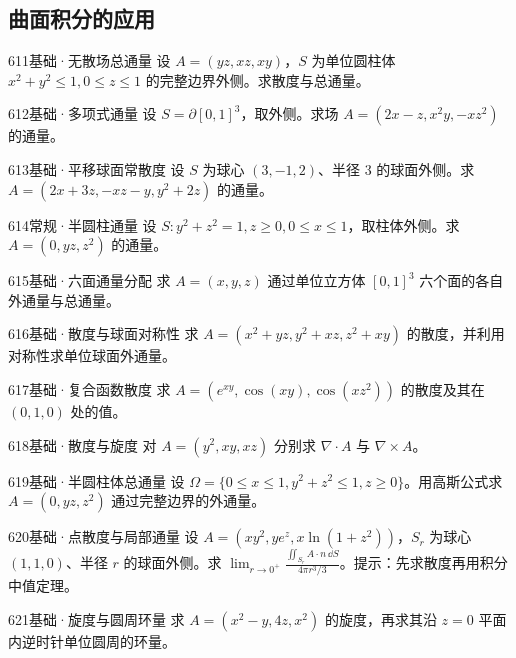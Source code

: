 \subsection{曲面积分的应用}
\begin{exercise}{611}{基础·无散场总通量}
设 $A=(yz,xz,xy)$，$S$ 为单位圆柱体 $x^2+y^2\leq1,0\leq z\leq1$ 的完整边界外侧。求散度与总通量。
\end{exercise}
\begin{exercise}{612}{基础·多项式通量}
设 $S=\partial[0,1]^3$，取外侧。求场 $A=(2x-z,x^2y,-xz^2)$ 的通量。
\end{exercise}
\begin{exercise}{613}{基础·平移球面常散度}
设 $S$ 为球心 $(3,-1,2)$、半径 $3$ 的球面外侧。求 $A=(2x+3z,-xz-y,y^2+2z)$ 的通量。
\end{exercise}
\begin{exercise}{614}{常规·半圆柱通量}
设 $S:y^2+z^2=1,z\geq0,0\leq x\leq1$，取柱体外侧。求 $A=(0,yz,z^2)$ 的通量。
\end{exercise}
\begin{exercise}{615}{基础·六面通量分配}
求 $A=(x,y,z)$ 通过单位立方体 $[0,1]^3$ 六个面的各自外通量与总通量。
\end{exercise}
\begin{exercise}{616}{基础·散度与球面对称性}
求 $A=(x^2+yz,y^2+xz,z^2+xy)$ 的散度，并利用对称性求单位球面外通量。
\end{exercise}
\begin{exercise}{617}{基础·复合函数散度}
求 $A=(e^{xy},\cos(xy),\cos(xz^2))$ 的散度及其在 $(0,1,0)$ 处的值。
\end{exercise}
\begin{exercise}{618}{基础·散度与旋度}
对 $A=(y^2,xy,xz)$ 分别求 $\nabla\cdot A$ 与 $\nabla\times A$。
\end{exercise}
\begin{exercise}{619}{基础·半圆柱体总通量}
设 $\Omega=\{0\leq x\leq1,y^2+z^2\leq1,z\geq0\}$。用高斯公式求 $A=(0,yz,z^2)$ 通过完整边界的外通量。
\end{exercise}
\begin{exercise}{620}{基础·点散度与局部通量}
设 $A=(xy^2,ye^z,x\ln(1+z^2))$，$S_r$ 为球心 $(1,1,0)$、半径 $r$ 的球面外侧。求 $\lim_{r\to0^+}\frac{\iint_{S_r}A\cdot n\,\dd S}{4\pi r^3/3}$。提示：先求散度再用积分中值定理。
\end{exercise}
\begin{exercise}{621}{基础·旋度与圆周环量}
求 $A=(x^2-y,4z,x^2)$ 的旋度，再求其沿 $z=0$ 平面内逆时针单位圆周的环量。
\end{exercise}
